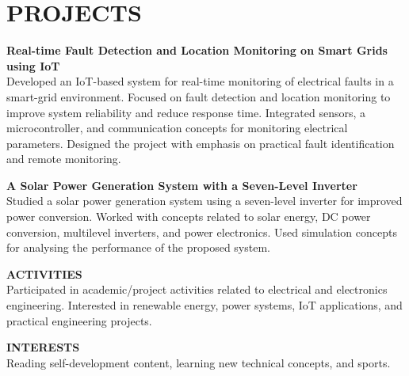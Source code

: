 \documentclass[9.5pt,a4paper]{extarticle}
\begin{document}
\section*{PROJECTS}
\noindent \textbf{Real-time Fault Detection and Location Monitoring on Smart Grids using IoT} \\
Developed an IoT-based system for real-time monitoring of electrical faults in a smart-grid environment. Focused on fault detection and location monitoring to improve system reliability and reduce response time. Integrated sensors, a microcontroller, and communication concepts for monitoring electrical parameters. Designed the project with emphasis on practical fault identification and remote monitoring. \vspace{4pt}

\noindent \textbf{A Solar Power Generation System with a Seven-Level Inverter} \\
Studied a solar power generation system using a seven-level inverter for improved power conversion. Worked with concepts related to solar energy, DC power conversion, multilevel inverters, and power electronics. Used simulation concepts for analysing the performance of the proposed system. \vspace{4pt}

\noindent \textbf{ACTIVITIES} \\
Participated in academic/project activities related to electrical and electronics engineering. Interested in renewable energy, power systems, IoT applications, and practical engineering projects. \vspace{4pt}

\noindent \textbf{INTERESTS} \\
Reading self-development content, learning new technical concepts, and sports. \vspace{4pt}


\end{document}
